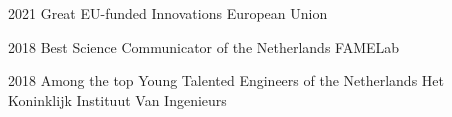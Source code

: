 \documentclass[print]{styles/friggeri-cv-mac} %
\begin{document}
\begin{entrylist}
	
\vspace{-0.3cm}
\entry
{2021}
{Great EU-funded Innovations}
{European Union}

\vspace{-0.3cm}
\entry
{2018}
{Best Science Communicator of the Netherlands}
{FAMELab}

\vspace{-0.3cm}
\entry
{2018}
{Among the top Young Talented Engineers of the Netherlands}
{Het Koninklijk Instituut Van Ingenieurs}

%
%
%
%
%
%
%
%
%
%

\end{entrylist}

\end{document}
